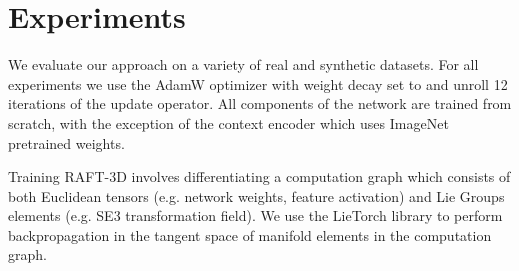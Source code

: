\documentclass[final]{cvpr}
\begin{document}
\section{Experiments}

We evaluate our approach on a variety of real and synthetic datasets. For all experiments we use the AdamW optimizer\cite{loshchilov2017decoupled} with weight decay set to  and unroll 12 iterations of the update operator. All components of the network are trained from scratch, with the exception of the context encoder which uses ImageNet~\cite{deng2009imagenet} pretrained weights. 

Training RAFT-3D involves differentiating a computation graph which consists of both Euclidean tensors (e.g. network weights, feature activation) and Lie Groups elements (e.g. SE3 transformation field). We use the LieTorch library\cite{teed2021tangent} to perform backpropagation in the tangent space of manifold elements in the computation graph.


\begin{table}[h]
\centering
{}
\caption{3D scene flow results on the FlyingThings3D dataset using the split proposed by Liu et al \cite{liu2019flownet3d} where only non-occluded points with depth 35m are considered for evaluation. Our method outperforms existing point-based scene flow networks by a large margin.}
\label{table:FlyingThingsResults3D}
\end{table}
\end{document}

